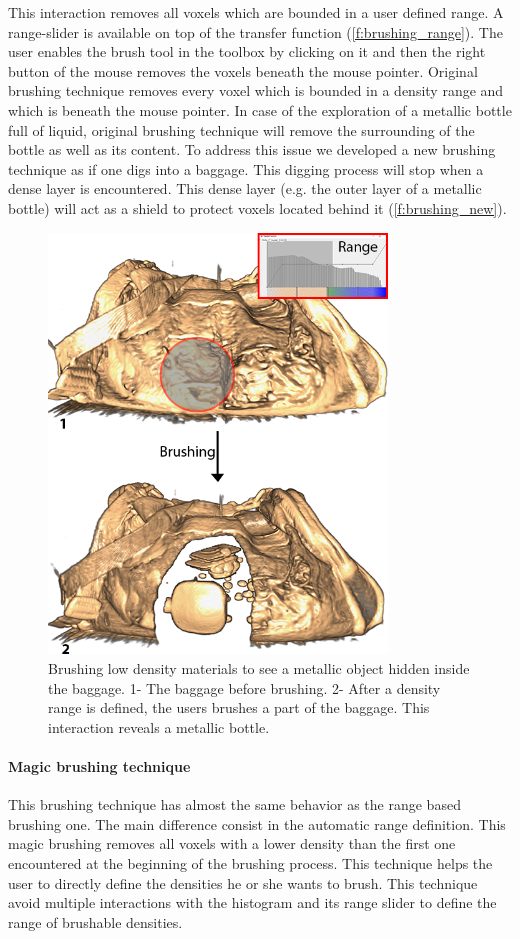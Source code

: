 This interaction removes all voxels which are bounded in a user defined range. A range-slider is available on top of the transfer function (\autoref{f:brushing_range}). The user enables the brush tool in the toolbox by clicking on it and then the right button of the mouse removes the voxels beneath the mouse pointer.
Original brushing technique removes every voxel which is bounded in a density range and which is beneath the mouse pointer. In case of the exploration of a metallic bottle full of liquid, original brushing technique will remove the surrounding of the bottle as well as its content. To address this issue we developed a new brushing technique as if one digs into a baggage. This digging process will stop when a dense layer is encountered. This dense layer (e.g. the outer layer of a metallic bottle) will act as a shield to protect voxels located behind it (\autoref{f:brushing_new}).

 \begin{figure}
\centering	\includegraphics[width=9cm]{Figures/brushing-range.png}
	\caption[Brushing low density materials to see a metallic object hidden inside the baggage.]{ Brushing low density materials to see a metallic object hidden inside the baggage. 1- The baggage before brushing. 2- After a density range is defined, the users brushes a part of the baggage. This interaction reveals a metallic bottle.   }
	\label{f:brushing_range}
\end{figure}

\paragraph{Magic brushing technique}
This brushing technique has almost the same behavior as the range based brushing one. The main difference consist in the automatic range definition. This magic brushing removes all voxels with a lower density than the first one encountered at the beginning of the brushing process. This technique helps the user to directly define the densities he or she wants to brush. This technique avoid multiple interactions with the histogram and its range slider to define the range of brushable densities.

